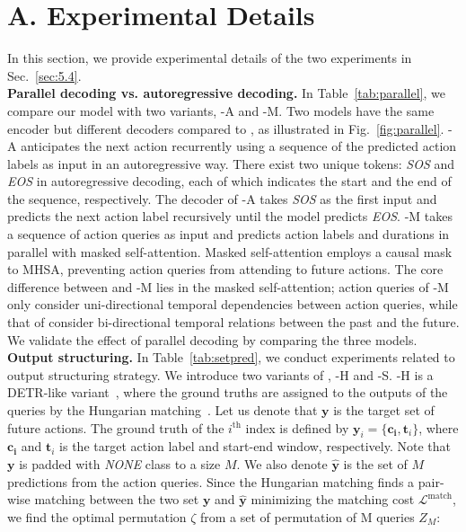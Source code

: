 
\section*{A. Experimental Details}
\label{sec:A}
In this section, we provide experimental details of the two experiments in Sec.~\ref{sec:5.4}.
\noindent
\\
\textbf{Parallel decoding vs. autoregressive decoding.}
In Table~\ref{tab:parallel}, we compare our model with two \ours variants, \ours-A and \ours-M.
Two models have the same encoder but different decoders compared to \ours, as illustrated in Fig.~\ref{fig:parallel}.
\ours-A anticipates the next action recurrently using a sequence of the predicted action labels as input in an autoregressive way.
There exist two unique tokens: \textit{SOS} and \textit{EOS} in autoregressive decoding, each of which indicates the start and the end of the sequence, respectively.
The decoder of \ours-A takes \textit{SOS} as the first input and predicts the next action label recursively until the model predicts \textit{EOS}.
\ours-M takes a sequence of action queries as input and predicts action labels and durations in parallel with masked self-attention. Masked self-attention employs a causal mask to MHSA, preventing action queries from attending to future actions.
The core difference between \ours and \ours-M lies in the masked self-attention; action queries of \ours-M only consider uni-directional temporal dependencies between action queries, while that of \ours consider bi-directional temporal relations between the past and the future.  
We validate the effect of parallel decoding by comparing the three models.
\\
\noindent
\textbf{Output structuring.}
In Table~\ref{tab:setpred}, we conduct experiments related to output structuring strategy.
We introduce two variants of \ours, \ours-H and \ours-S. 
\ours-H is a DETR-like variant~\cite{carion2020end}, where the ground truths are assigned to the outputs of the queries by the Hungarian matching~\cite{kuhn1955hungarian}.
Let us denote that $\bm{y}$ is the target set of future actions. 
The ground truth of the $i^{\mathrm{th}}$ index is defined by $\bm{y}_i = \{\bm{c_i}, \bm{t}_i\}$, where $\bm{c_i}$ and $\bm{t}_i$ is the target action label and start-end window, respectively.
Note that $\bm{y}$ is padded with \textit{NONE} class to a size $M$.
We also denote $\hat{\bm{y}}$ is the set of $M$ predictions from the action queries. 
Since the Hungarian matching finds a pair-wise matching between the two set $\bm{y}$ and $\hat{\bm{y}}$ minimizing the matching cost $\mathcal{L}^{\mathrm{match}}$, we find the optimal permutation $\zeta$ from a set of permutation of M queries $Z_M$:
